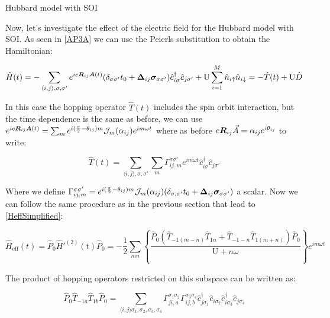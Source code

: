 \begin{section}{Hubbard model with SOI}

Now, let's investigate the effect of the electric field for the Hubbard model with SOI. As seen in \ref{AP3A} we can use the Peierls substitution to obtain the Hamiltonian:

\begin{equation}
\hat{H}(t) = -\sum_{\langle i,j \rangle, \sigma, \sigma'} e^{ie\boldsymbol{R}_{ij}\boldsymbol{A}(t)} (\delta_{\sigma \sigma'}t_0 + \boldsymbol{\Delta}_{ij}\boldsymbol{\sigma}_{\sigma \sigma'}) \hat{c}_{i \sigma}^\dagger \hat{c}_{j \sigma'} + \text{U} \sum_{i=1}^M \hat{n}_{i\uparrow}\hat{n}_{i\downarrow} = -\hat{T}(t) + \text{U}\hat{D}
\end{equation}

In this case the hopping operator $\hat{T}(t)$ includes the spin orbit interaction, but the time dependence is the same as before, we can use $e^{ie\boldsymbol{R}_{ij}\boldsymbol{A}(t)} =  \sum_m e^{i(\frac{\pi}{2}-\theta_{ij})m} \mathcal{J}_m(\alpha_{ij}) e^{im\omega t}$ where as before $e\boldsymbol{R}_{ij}\vec{A} = \alpha_{ij} e^{i \theta_{ij}}$ to write:

\begin{equation}
\hat{T}(t) = \sum_{\langle i,j \rangle, \sigma, \sigma'} \sum_m \Gamma_{ij,m}^{\sigma\sigma'} e^{im \omega t} \hat{c}_{i \sigma}^\dagger \hat{c}_{j \sigma'}
\end{equation}

Where we define $\Gamma_{ij,m}^{\sigma\sigma'} = e^{i(\frac{\pi}{2}-\theta_{ij})m} \mathcal{J}_m(\alpha_{ij})(\delta_{\sigma, \sigma'}t_0+\boldsymbol{\Delta}_{ij}\boldsymbol{\sigma}_{\sigma \sigma'})$ a scalar. Now we can follow the same procedure as in the previous section that lead to \ref{HeffSimplified}:

\begin{equation}
\hat{H}_{\text{eff}}(t) = \hat{P}_0 \hat{H}'^{(2)}(t) \hat{P}_0 = -\frac{1}{2}\sum_{mn} \left\{ \frac{\hat{P}_0 \left(\hat{T}_{-1(m-n)}\hat{T}_{1n} + \hat{T}_{-1-n}\hat{T}_{1(m+n)} \right) \hat{P}_0 }{\text{U}+n\omega} \right\} e^{im\omega t}
\end{equation}

The product of hopping operators restricted on this subspace can be written as:

\begin{equation}
\hat{P}_0 \hat{T}_{-1a}\hat{T}_{1b} \hat{P}_0 = \sum_{\langle i,j \rangle \sigma_1, \sigma_2, \sigma_3, \sigma_4} \Gamma_{ji,a}^{\sigma_1\sigma_2}\Gamma_{ij,b}^{\sigma_3\sigma_4} \hat{c}_{j\sigma_1}^\dagger\hat{c}_{i\sigma_2}\hat{c}_{i\sigma_3}^\dagger\hat{c}_{j\sigma_4}
\end{equation}


\end{section}
